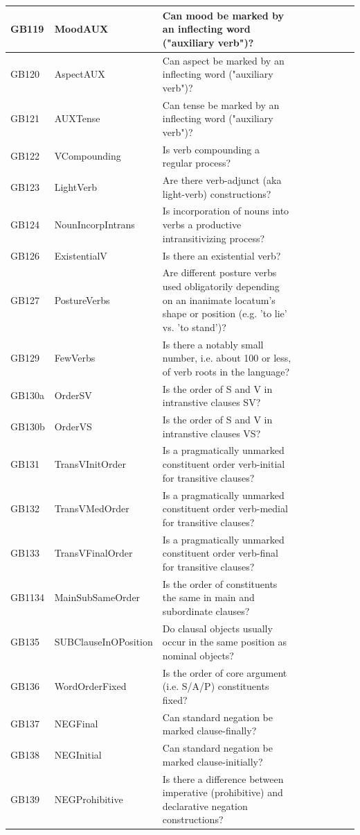 \documentclass[a4paper,10pt]{article} %
\begin{document}
\begin{landscape}
\begin{longtable}{| l | p{4cm}| p{12cm}|p{2cm}|p{2cm}|p{2cm}|p{2cm}|p{2cm}|p{2cm}|}
GB119 & MoodAUX&Can mood be marked by an inflecting word ("auxiliary verb")?\\ \hline
GB120 & AspectAUX&Can aspect be marked by an inflecting word ("auxiliary verb")?\\ \hline
GB121 & AUXTense&Can tense be marked by an inflecting word ("auxiliary verb")?\\ \hline
GB122 & VCompounding&Is verb compounding a regular process?\\ \hline
GB123 & LightVerb&Are there verb-adjunct (aka light-verb) constructions?\\ \hline
GB124 & NounIncorpIntrans&Is incorporation of nouns into verbs a productive intransitivizing process?\\ \hline
GB126 & ExistentialV&Is there an existential verb?\\ \hline
GB127 & PostureVerbs&Are different posture verbs used obligatorily depending on an inanimate locatum's shape or position (e.g. 'to lie' vs. 'to stand')?\\ \hline
GB129 & FewVerbs&Is there a notably small number, i.e. about 100 or less, of verb roots in the language?\\ \hline
GB130a & OrderSV&Is the order of S and V in intranstive clauses SV?\\ \hline
GB130b & OrderVS&Is the order of S and V in intranstive clauses VS?\\ \hline
GB131 & TransVInitOrder&Is a pragmatically unmarked constituent order verb-initial for transitive clauses?\\ \hline
GB132 & TransVMedOrder&Is a pragmatically unmarked constituent order verb-medial for transitive clauses?\\ \hline
GB133 & TransVFinalOrder&Is a pragmatically unmarked constituent order verb-final for transitive clauses?\\ \hline
GB1134 & MainSubSameOrder&Is the order of constituents the same in main and subordinate clauses?\\ \hline
GB135 & SUBClauseInOPosition&Do clausal objects usually occur in the same position as nominal objects?\\ \hline
GB136 & WordOrderFixed&Is the order of core argument (i.e. S/A/P) constituents fixed?\\ \hline
GB137 & NEGFinal&Can standard negation be marked clause-finally?\\ \hline
GB138 & NEGInitial&Can standard negation be marked clause-initially?\\ \hline
GB139 & NEGProhibitive&Is there a difference between imperative (prohibitive) and declarative negation constructions?\\ \hline

\end{longtable}
\end{landscape}
\end{document}
